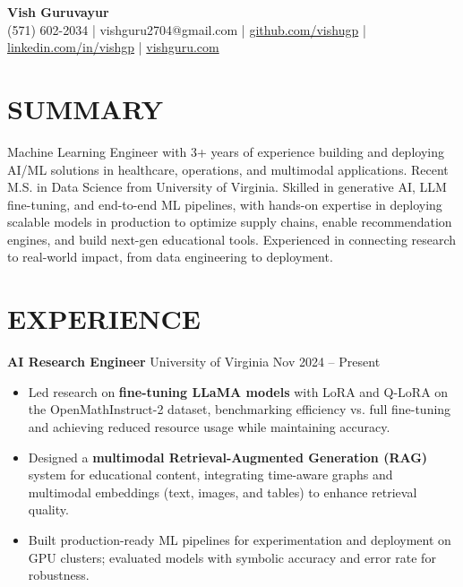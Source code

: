 \documentclass[letterpaper,11pt]{article}
\begin{document}
\begin{center}
    \textbf{\Huge Vish Guruvayur} \\[6pt]
    (571) 602-2034 \quad | \quad vishguru2704@gmail.com \quad | \quad \href{https://github.com/vishugp}{github.com/vishugp} \quad | \quad \href{https://linkedin.com/in/vishgp}{linkedin.com/in/vishgp} \quad | \quad \href{https://vishguru.com}{vishguru.com}
\end{center}

\section*{SUMMARY}
Machine Learning Engineer with 3+ years of experience building and deploying AI/ML solutions in healthcare, operations, and multimodal applications. Recent M.S. in Data Science from University of Virginia. Skilled in generative AI, LLM fine-tuning, and end-to-end ML pipelines, with hands-on expertise in deploying scalable models in production to optimize supply chains, enable recommendation engines, and build next-gen educational tools. Experienced in connecting research to real-world impact, from data engineering to deployment.

\section*{EXPERIENCE}

\textbf{AI Research Engineer} \hfill University of Virginia \quad Nov 2024 -- Present \\
\begin{itemize}[leftmargin=*]
    \item Led research on \textbf{fine-tuning LLaMA models} with LoRA and Q-LoRA on the OpenMathInstruct-2 dataset, benchmarking efficiency vs. full fine-tuning and achieving reduced resource usage while maintaining accuracy.
    \item Designed a \textbf{multimodal Retrieval-Augmented Generation (RAG)} system for educational content, integrating time-aware graphs and multimodal embeddings (text, images, and tables) to enhance retrieval quality.
    \item Built production-ready ML pipelines for experimentation and deployment on GPU clusters; evaluated models with symbolic accuracy and error rate for robustness.
\end{itemize}
\end{document}
